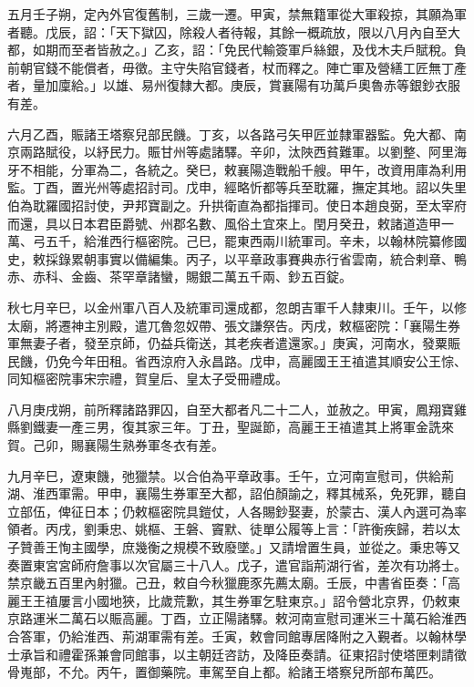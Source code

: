 \begin{pinyinscope}
 五月壬子朔，定內外官復舊制，三歲一遷。甲寅，禁無籍軍從大軍殺掠，其願為軍者聽。戊辰，詔：「天下獄囚，除殺人者待報，其餘一概疏放，限以八月內自至大都，如期而至者皆赦之。」乙亥，詔：「免民代輸簽軍戶絲銀，及伐木夫戶賦稅。負前朝官錢不能償者，毋徵。主守失陷官錢者，杖而釋之。陣亡軍及營繕工匠無丁產者，量加廩給。」以雄、易州復隸大都。庚辰，賞襄陽有功萬戶奧魯赤等銀鈔衣服有差。



 六月乙酉，賑諸王塔察兒部民饑。丁亥，以各路弓矢甲匠並隸軍器監。免大都、南京兩路賦役，以紓民力。賑甘州等處諸驛。辛卯，汰陜西貧難軍。以劉整、阿里海牙不相能，分軍為二，各統之。癸巳，敕襄陽造戰船千艘。甲午，改資用庫為利用監。丁酉，置光州等處招討司。戊申，經略忻都等兵至耽羅，撫定其地。詔以失里伯為耽羅國招討使，尹邦寶副之。升拱衛直為都指揮司。使日本趙良弼，至太宰府而還，具以日本君臣爵號、州郡名數、風俗土宜來上。閏月癸丑，敕諸道造甲一萬、弓五千，給淮西行樞密院。己巳，罷東西兩川統軍司。辛未，以翰林院纂修國史，敕採錄累朝事實以備編集。丙子，以平章政事賽典赤行省雲南，統合剌章、鴨赤、赤科、金齒、茶罕章諸蠻，賜銀二萬五千兩、鈔五百錠。



 秋七月辛巳，以金州軍八百人及統軍司還成都，忽朗吉軍千人隸東川。壬午，以修太廟，將遷神主別殿，遣兀魯忽奴帶、張文謙祭告。丙戌，敕樞密院：「襄陽生券軍無妻子者，發至京師，仍益兵衛送，其老疾者遣還家。」庚寅，河南水，發粟賑民饑，仍免今年田租。省西涼府入永昌路。戊申，高麗國王王禃遣其順安公王悰、同知樞密院事宋宗禮，賀皇后、皇太子受冊禮成。



 八月庚戌朔，前所釋諸路罪囚，自至大都者凡二十二人，並赦之。甲寅，鳳翔寶雞縣劉鐵妻一產三男，復其家三年。丁丑，聖誕節，高麗王王禃遣其上將軍金詵來賀。己卯，賜襄陽生熟券軍冬衣有差。



 九月辛巳，遼東饑，弛獵禁。以合伯為平章政事。壬午，立河南宣慰司，供給荊湖、淮西軍需。甲申，襄陽生券軍至大都，詔伯顏諭之，釋其械系，免死罪，聽自立部伍，俾征日本；仍敕樞密院具鎧仗，人各賜鈔娶妻，於蒙古、漢人內選可為率領者。丙戌，劉秉忠、姚樞、王磐、竇默、徒單公履等上言：「許衡疾歸，若以太子贊善王恂主國學，庶幾衡之規模不致廢墜。」又請增置生員，並從之。秉忠等又奏置東宮宮師府詹事以次官屬三十八人。戊子，遣官詣荊湖行省，差次有功將士。禁京畿五百里內射獵。己丑，敕自今秋獵鹿豕先薦太廟。壬辰，中書省臣奏：「高麗王王禃屢言小國地狹，比歲荒歉，其生券軍乞駐東京。」詔令營北京界，仍敕東京路運米二萬石以賑高麗。丁酉，立正陽諸驛。敕河南宣慰司運米三十萬石給淮西合答軍，仍給淮西、荊湖軍需有差。壬寅，敕會同館專居降附之入覲者。以翰林學士承旨和禮霍孫兼會同館事，以主朝廷咨訪，及降臣奏請。征東招討使塔匣剌請徵骨嵬部，不允。丙午，置御藥院。車駕至自上都。給諸王塔察兒所部布萬匹。




\end{pinyinscope}
